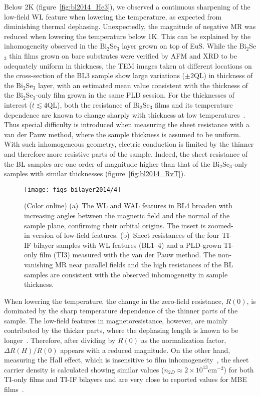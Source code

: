 Below 2K (figure~\ref{fig:bl2014_He3}), we observed a continuous sharpening of the low-field WL feature when lowering the temperature, as expected from diminishing thermal dephasing. Unexpectedly, the magnitude of negative MR was reduced when lowering the temperature below 1K. This can be explained by the inhomogeneity observed in the Bi$_2$Se$_3$ layer grown on top of EuS. While the Bi$_2$Se$_3$ thin films grown on bare substrates were verified by AFM and XRD to be adequately uniform in thickness, the TEM images taken at different locations on the cross-section of the BL3 sample show large variations ($\pm2\mathrm{QL}$) in thickness of the Bi$_2$Se$_3$ layer, with an estimated mean value consistent with the thickness of the Bi$_2$Se$_3$-only film grown in the same PLD session. For the thicknesses of interest ($t\lesssim4\mathrm{QL}$), both the resistance of Bi$_2$Se$_3$ films and its temperature dependence are known to change sharply with thickness at low temperatures~\cite{TI_WAL_thickness}. Thus special difficulty is introduced when measuring the sheet resistance with a van der Pauw method, where the sample thickness is assumed to be uniform.\cite{VdP1958, VdP_contact_size} With such inhomogeneous geometry, electric conduction is limited by the thinner and therefore more resistive parts of the sample. Indeed, the sheet resistance of the BL samples are one order of magnitude higher than that of the Bi$_2$Se$_3$-only samples with similar thicknesses (figure~\ref{fig:bl2014_RvT}). %
%
\begin{figure}[ht]%
\centering%
\subfloat{\label{fig:bl2014_angular}}%
\subfloat{\label{fig:bl2014_RvT}}%
\texttt{[image: figs\_bilayer2014/4]}%
\caption[Angular dependence and temperature dependence of the transport properties of Bi$_2$Se$_3$--EuS bilayers]{(Color online) (a)~The WL and WAL features in BL4 broaden with increasing angles between the magnetic field and the normal of the sample plane, confirming their orbital origins. The insert is zoomed-in version of low-field features. (b)~Sheet resistances of the four TI-IF bilayer samples with WL features (BL1--4) and a PLD-grown TI-only film (TI3) measured with the van der Pauw method. The non-vanishing MR near parallel fields and the high resistances of the BL samples are consistent with the observed inhomogeneity in sample thickness.}%
\end{figure}%
%
When lowering the temperature, the change in the zero-field resistance, $R(0)$, is dominated by the sharp temperature dependence of the thinner parts of the sample. The low-field features in magnetoresistance, however, are mainly contributed by the thicker parts, where the dephasing length is known to be longer~\cite{TI_WAL_thickness}. Therefore, after dividing by $R(0)$ as the normalization factor, $\Delta{}R(H)/R(0)$ appears with a reduced magnitude. On the other hand, measuring the Hall effect, which is insensitive to film inhomogeneity~\cite{Landauer_Porous_Media}, the sheet carrier density is calculated showing similar values (\(n_{2D}\approx2\times10^{13}\mathrm{cm^{-2}}\)) for both TI-only films and TI-IF bilayers and are very close to reported values for MBE films~\cite{TI_WAL_thickness}.

